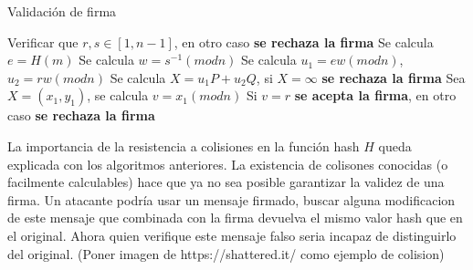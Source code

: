\begin{algorithm}
\caption{Validación de firma}\label{alg:verificar}
\begin{algorithmic}[1]
\State Verificar que $r,s \in [1, n-1]$, en otro caso \textbf{se rechaza la firma}
\State Se calcula $e = H(m)$
\State Se calcula $w = s^{-1} (mod n)$
\State Se calcula $u_{1} = ew (mod n)$, $u_{2} = rw (mod n)$
\State Se calcula $X = u_{1}P + u_{2}Q$, si $X=\infty$ \textbf{se rechaza la firma} 
\State Sea $X = (x_{1},y_{1})$, se calcula $v = x_{1} (mod n)$
\State Si $v = r$ \textbf{se acepta la firma}, en otro caso \textbf{se rechaza la firma}
\end{algorithmic}
\end{algorithm}

La importancia de la resistencia a colisiones en la función hash $H$ queda explicada con los algoritmos anteriores.
La existencia de colisones conocidas (o facilmente calculables) hace que ya no sea posible garantizar la validez de una firma. Un atacante podría usar un mensaje firmado, buscar alguna modificacion de este mensaje que combinada con la firma devuelva el mismo valor hash que en el original. Ahora quien verifique este mensaje falso seria incapaz de distinguirlo del original.
(Poner imagen de https://shattered.it/ como ejemplo de colision)


